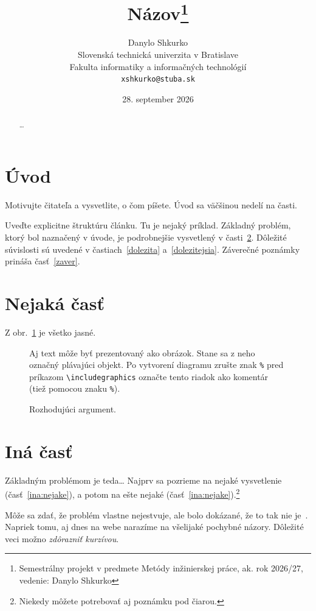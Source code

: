 \documentclass[10pt,twoside,slovak,a4paper]{article}
\title{Názov\thanks{Semestrálny projekt v predmete Metódy inžinierskej práce, ak. rok 2026/27, vedenie: Danylo Shkurko}} %
\author{Danylo Shkurko\\[2pt]
	{\small Slovenská technická univerzita v Bratislave}\\
	{\small Fakulta informatiky a informačných technológií}\\
	{\small \texttt{xshkurko@stuba.sk}}
	}
\date{\small 28. september 2026} %
\begin{document}
\maketitle

\begin{abstract}
\ldots
\end{abstract}



\section{Úvod}

Motivujte čitateľa a vysvetlite, o čom píšete. Úvod sa väčšinou nedelí na časti.

Uveďte explicitne štruktúru článku. Tu je nejaký príklad.
Základný problém, ktorý bol naznačený v úvode, je podrobnejšie vysvetlený v časti~\ref{nejaka}.
Dôležité súvislosti sú uvedené v častiach~\ref{dolezita} a~\ref{dolezitejsia}.
Záverečné poznámky prináša časť~\ref{zaver}.



\section{Nejaká časť} \label{nejaka}

Z obr.~\ref{f:rozhod} je všetko jasné. 

\begin{figure}[tbh]
\centering
Aj text môže byť prezentovaný ako obrázok. Stane sa z neho označný plávajúci objekt. Po vytvorení diagramu zrušte znak \texttt{\%} pred príkazom \verb|\includegraphics| označte tento riadok ako komentár (tiež pomocou znaku \texttt{\%}).
\caption{Rozhodujúci argument.}
\label{f:rozhod}
\end{figure}



\section{Iná časť} \label{ina}

Základným problémom je teda\ldots{} Najprv sa pozrieme na nejaké vysvetlenie (časť~\ref{ina:nejake}), a potom na ešte nejaké (časť~\ref{ina:nejake}).\footnote{Niekedy môžete potrebovať aj poznámku pod čiarou.}

Môže sa zdať, že problém vlastne nejestvuje\cite{Coplien:MPD}, ale bolo dokázané, že to tak nie je~\cite{Czarnecki:Staged, Czarnecki:Progress}. Napriek tomu, aj dnes na webe narazíme na všelijaké pochybné názory\cite{PLP-Framework}. Dôležité veci možno \emph{zdôrazniť kurzívou}.
\end{document}
